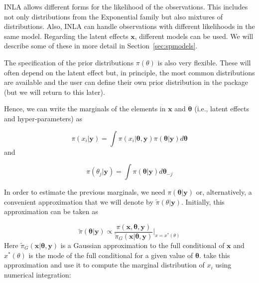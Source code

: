 \documentclass[article]{jss}
\begin{document}
INLA allows different forms for the likelihood of the observations.  This
includes not only distributions from the Exponential family but also mixtures
of distributions. Also, INLA can handle observations with different likelihoods
in the same model. Regarding the latent effects $\mathbf{x}$, different models
can be used. We will describe some of these in more detail in
Section~\ref{sec:spmodels}.


The specification of the prior distributions $\pi(\theta)$ is also very 
flexible. These will often depend on the latent effect but, in principle,
the most common distributions are available and the user can define their
own prior distribution in the  package (but we will return
to this later). 

Hence, we can write the marginals of the elements in $\mathbf{x}$
and $\mathbf{\theta}$ (i.e., latent effects and hyper-parameters) as

\begin{equation}
\pi(x_i|\mathbf{y}) = \int \pi(x_i|\mathbf{\theta}, \mathbf{y})  \pi(\mathbf{\theta}| \mathbf{y}) d\mathbf{\theta}
\end{equation}
\noindent
and

\begin{equation}
\pi(\theta_j|\mathbf{y}) = \int \pi(\mathbf{\theta}| \mathbf{y})  d\mathbf{\theta}_{-j} 
\end{equation}

In order to estimate the previous marginals, we need 
$\pi(\mathbf{\theta}|\mathbf{y})$ or, alternatively, a convenient
approximation that we will denote by $\tilde\pi(\theta|\mathbf{y})$.
Initially, this approximation can be taken as

\begin{equation}
\tilde\pi(\mathbf{\theta}|\mathbf{y})\propto 
\frac{\pi(\mathbf{x},\mathbf{\theta},\mathbf{y})}{\tilde\pi_G(\mathbf{x}|\mathbf{\theta},\mathbf{y})}\bigg|_{x=x^*(\theta)}
\end{equation}
\noindent
Here 
$\tilde\pi_G(\mathbf{x}|\mathbf{\theta},\mathbf{y})$ is a Gaussian
approximation to the full conditional of $\mathbf{x}$ and $x^*(\theta)$
is the mode of the full conditional for a given value of $\mathbf{\theta}$.
\citet{isi:000264374200002} take this approximation and use it 
to compute the marginal distribution of $x_i$ using numerical integration:
\end{document}
